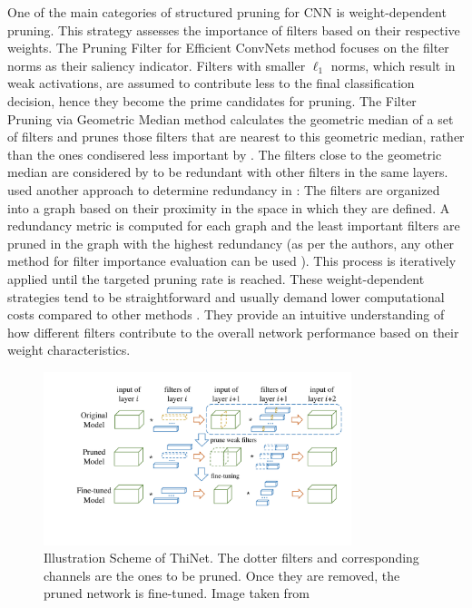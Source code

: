 One of the main categories of structured pruning for \ac{CNN} is
weight-dependent pruning. This strategy assesses the importance of filters based
on their respective weights. The Pruning Filter for Efficient ConvNets method
\cite{DBLP:conf/iclr/0022KDSG17} focuses on the filter norms as their saliency
indicator. Filters with smaller $\ell_1$ norms, which result in weak
activations, are assumed to contribute less to the final classification
decision, hence they become the prime candidates for pruning.  The Filter
Pruning via Geometric Median method \cite{DBLP:conf/cvpr/HeLWHY19} calculates
the geometric median of a set of filters and prunes those filters that are
nearest to this geometric median, rather than the ones condisered less important
by \cite{DBLP:conf/iclr/0022KDSG17}. The filters close to the geometric median
are considered by \citeauthor{DBLP:conf/cvpr/HeLWHY19} to be redundant with
other filters in the same layers. \citeauthor{DBLP:conf/cvpr/WangLW21} used
another approach to determine redundancy in \cite{DBLP:conf/cvpr/WangLW21}: The
filters are organized into a graph based on their proximity in the space in
which they are defined. A redundancy metric is computed for each graph and the
least important filters are pruned in the graph with the highest redundancy (as
per the authors, any other method for filter importance evaluation can be used
\cite{DBLP:conf/iclr/0022KDSG17,DBLP:journals/access/PolyakW15,DBLP:conf/iclr/MolchanovTKAK17}).
This process is iteratively applied until the targeted pruning rate is reached.
These weight-dependent strategies tend to be straightforward and usually demand
lower computational costs compared to other methods
\cite{DBLP:journals/corr/abs-2303-00566}. They provide an intuitive
understanding of how different filters contribute to the overall network
performance based on their weight characteristics. \\


\begin{figure}[htbp]
    \centering
    \includegraphics[width=0.8\textwidth]{chapter_sota/assets/thinet.pdf}
    \caption{Illustration Scheme of ThiNet. The dotter filters and corresponding
    channels are the ones to be pruned. Once they are removed, the pruned network
    is fine-tuned. Image taken from \cite{DBLP:conf/iccv/LuoWL17}}
    \label{fig:sota:thinet}
\end{figure}

